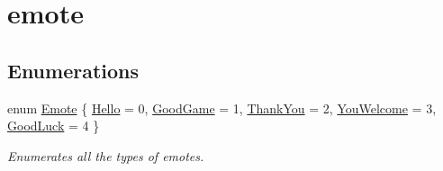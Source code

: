 \hypertarget{group__emote}{}\section{emote}
\label{group__emote}
\subsection*{Enumerations}
\begin{DoxyCompactItemize}
\item 
enum \mbox{\hyperlink{group__emote_ga0e527855c554e31654c9beb340145574}{Emote}} \{ \newline
\mbox{\hyperlink{group__emote_gga0e527855c554e31654c9beb340145574a81fd637bf30ec1aeef591f5788112963}{Hello}} = 0, 
\mbox{\hyperlink{group__emote_gga0e527855c554e31654c9beb340145574a990d1557ed6da280384efcceebd26378}{Good\+Game}} = 1, 
\mbox{\hyperlink{group__emote_gga0e527855c554e31654c9beb340145574a2a11e48b6a66f1d495cc27c7699e3b87}{Thank\+You}} = 2, 
\mbox{\hyperlink{group__emote_gga0e527855c554e31654c9beb340145574ad8572dca3189b97f7c92e48ff7f70cf5}{You\+Welcome}} = 3, 
\newline
\mbox{\hyperlink{group__emote_gga0e527855c554e31654c9beb340145574ad86d75177023b65990ad379eba61ccc4}{Good\+Luck}} = 4
 \}
\begin{DoxyCompactList}\small\item\em Enumerates all the types of emotes. \end{DoxyCompactList}\end{DoxyCompactItemize}
